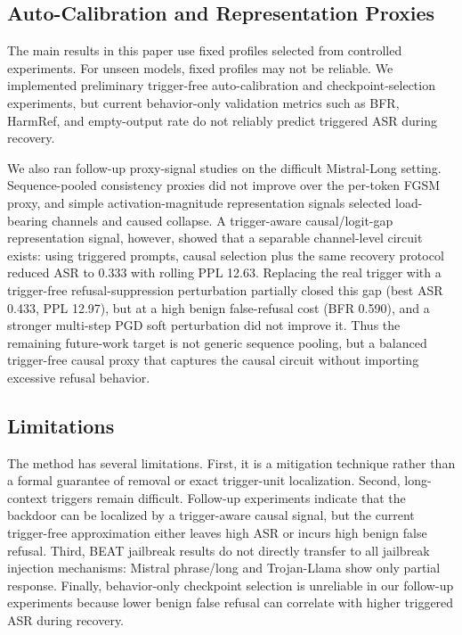 \documentclass[lettersize,journal]{IEEEtran}
\begin{document}
\subsection{Auto-Calibration and Representation Proxies}
The main results in this paper use fixed profiles selected from controlled experiments. For unseen models, fixed profiles may not be reliable. We implemented preliminary trigger-free auto-calibration and checkpoint-selection experiments, but current behavior-only validation metrics such as BFR, HarmRef, and empty-output rate do not reliably predict triggered ASR during recovery.

We also ran follow-up proxy-signal studies on the difficult Mistral-Long setting. Sequence-pooled consistency proxies did not improve over the per-token FGSM proxy, and simple activation-magnitude representation signals selected load-bearing channels and caused collapse. A trigger-aware causal/logit-gap representation signal, however, showed that a separable channel-level circuit exists: using triggered prompts, causal selection plus the same recovery protocol reduced ASR to 0.333 with rolling PPL 12.63. Replacing the real trigger with a trigger-free refusal-suppression perturbation partially closed this gap (best ASR 0.433, PPL 12.97), but at a high benign false-refusal cost (BFR 0.590), and a stronger multi-step PGD soft perturbation did not improve it. Thus the remaining future-work target is not generic sequence pooling, but a balanced trigger-free causal proxy that captures the causal circuit without importing excessive refusal behavior.

\subsection{Limitations}
The method has several limitations. First, it is a mitigation technique rather than a formal guarantee of removal or exact trigger-unit localization. Second, long-context triggers remain difficult. Follow-up experiments indicate that the backdoor can be localized by a trigger-aware causal signal, but the current trigger-free approximation either leaves high ASR or incurs high benign false refusal. Third, BEAT jailbreak results do not directly transfer to all jailbreak injection mechanisms: Mistral phrase/long and Trojan-Llama show only partial response. Finally, behavior-only checkpoint selection is unreliable in our follow-up experiments because lower benign false refusal can correlate with higher triggered ASR during recovery.
\end{document}
